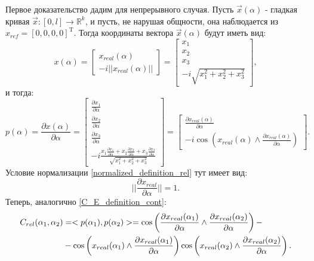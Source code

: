 Первое доказательство дадим для непрерывного случая. Пусть $\vec{x}(\alpha)$ - гладкая кривая $\vec{x} : [0, l] \rightarrow \mathbb{R}^k$,
и пусть, не нарушая общности, она наблюдается из $x_{ref} = [0, 0, 0, 0]^\mathrm{T}$. Тогда координаты вектора $\vec{x}(\alpha)$ будут иметь вид:
\begin{equation}
	x(\alpha) = \begin{bmatrix} x_{real}(\alpha) \\ -i||x_{real}(\alpha)|| \end{bmatrix} = \begin{bmatrix} x_1 \\ x_2 \\ x_3 \\ -i\sqrt{x_1^2 + x_2^2 + x_3^2} \end{bmatrix},
\end{equation}
и тогда:
\begin{equation}
	p(\alpha) = \frac{\partial x(\alpha)}{\partial \alpha} = \begin{bmatrix} \frac{\partial x_1}{\partial \alpha} \\ \frac{\partial x_2}{\partial \alpha} \\ \frac{\partial x_3}{\partial \alpha} \\
	-i\frac{x_1\frac{\partial x_1}{\partial \alpha} + x_2\frac{\partial x_2}{\partial \alpha} + x_3\frac{\partial x_3}{\partial \alpha}}{\sqrt{x_1^2 + x_2^2 + x_3^2}} \end{bmatrix} =
	\begin{bmatrix} \frac{\partial x_{real}(\alpha)}{\partial \alpha} \\ -i\cos\left(x_{real}(\alpha) \wedge \frac{\partial x_{real}(\alpha)}{\partial \alpha}\right) \end{bmatrix}.
\end{equation}
Условие нормализации \ref{normalized_definition_rel} тут имеет вид:
\begin{equation}
	||\frac{\partial x_{real}}{\partial \alpha}|| = 1.
	\label{normalized_definition_rel_cont}
\end{equation}
Теперь, аналогично \ref{C_E_definition_cont}:
\begin{align}
	C_{rel}(\alpha_1, \alpha_2) &= <p(\alpha_1), p(\alpha_2)> =
	\cos\left(\frac{\partial x_{real}(\alpha_1)}{\partial \alpha}\wedge\frac{\partial x_{real}(\alpha_2)}{\partial \alpha}\right) - \notag \\
	&- \cos\left(x_{real}(\alpha_1) \wedge \frac{\partial x_{real}(\alpha_1)}{\partial \alpha}\right)\cos\left(x_{real}(\alpha_2) \wedge \frac{\partial x_{real}(\alpha_2)}{\partial \alpha}\right).
	\label{C_rel_value_cont}
\end{align}
